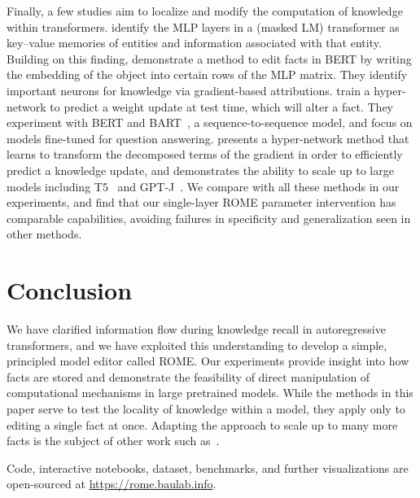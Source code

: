 \documentclass{article}
\newcommand{\method}{ROME\xspace}
\begin{document}
 




 
 
 




Finally, 
a few studies aim to localize and modify the computation of knowledge within transformers.
\citet{geva-etal-2021-transformer} identify the MLP layers in a (masked LM) transformer as key--value memories of entities and information associated with that entity. 
Building on this finding, 
\citet{dai-kn} demonstrate a method to edit facts in BERT by writing the embedding of the object into certain rows of the MLP matrix. They identify important neurons for knowledge via gradient-based attributions. 
\citet{decao-ke} train a hyper-network to predict a weight update at test time, which will alter a fact. They experiment with BERT and BART~\citep{lewis-etal-2020-bart}, a sequence-to-sequence model, and focus on models fine-tuned for question answering.
\citet{mend} presents a hyper-network method that learns to transform the decomposed terms of the gradient in order to efficiently predict a knowledge update, and demonstrates the ability to scale up to large models including T5~\citep{raffel2020exploring} and GPT-J~\citep{gpt-j}.
We compare with all these methods in our experiments, and find that our single-layer \method parameter intervention has comparable capabilities, avoiding failures in specificity and generalization seen in other methods.




\section{Conclusion}

We have clarified information flow during knowledge recall in autoregressive transformers, and we have exploited this understanding to develop a simple, principled model editor called \method. Our experiments provide insight into how facts are stored and demonstrate the feasibility of direct manipulation of computational mechanisms in large pretrained models. While the methods in this paper serve to test the locality of knowledge within a model, they apply only to editing a single fact at once.  Adapting the approach to scale up to many more facts is the subject of other work such as~\citet*{meng2022memit}.

Code, interactive notebooks, dataset, benchmarks, and further visualizations are open-sourced at \url{https://rome.baulab.info}.
\end{document}
